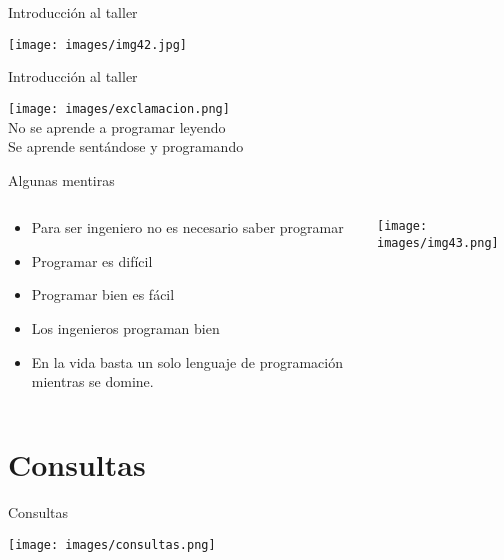 \documentclass{bredelebeamer}
\begin{document}
\begin{frame}{Introducción al taller}
\begin{large}
\begin{center}
\texttt{[image: images/img42.jpg]}
\end{center}
\end{large}
\end{frame}

\begin{frame}{Introducción al taller}
\begin{Huge}
\begin{center}
\texttt{[image: images/exclamacion.png]}
\\No se aprende a programar leyendo \\Se aprende sentándose y programando 
\end{center}
\end{Huge}
\end{frame}

\begin{frame}{Algunas mentiras}
\begin{columns}
\begin{column}{0.5\textwidth}
\begin{itemize}
\item Para ser ingeniero no es necesario saber programar
\item Programar es difícil
\item Programar bien es fácil
\item Los ingenieros programan bien
\item En la vida basta un solo lenguaje de programación mientras se domine.
\end{itemize}
\end{column}
\begin{column}{0.23\textwidth}
\begin{center}
\texttt{[image: images/img43.png]}
\end{center}
\end{column}
\end{columns}
\end{frame}





\section{Consultas}
\begin{frame}{Consultas}
\begin{center}
\texttt{[image: images/consultas.png]}
\end{center}
\end{frame}
\end{document}
